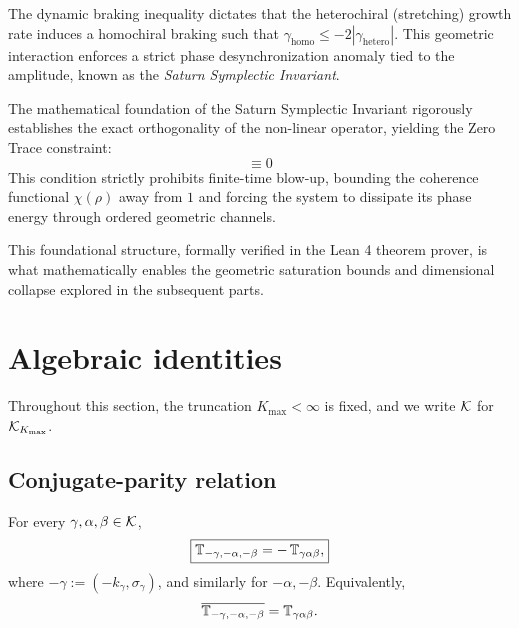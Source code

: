 \begin{theorem}\label{part-1:thm:saturation}
The dynamic braking inequality dictates that the heterochiral (stretching) growth rate induces a homochiral braking such that $\gamma_{\text{homo}} \leq -2 |\gamma_{\text{hetero}}|$. This geometric interaction enforces a strict phase desynchronization anomaly tied to the amplitude, known as the \emph{Saturn Symplectic Invariant}. 
\end{theorem}

\begin{corollary}\label{part-1:cor:zero-trace}
The mathematical foundation of the Saturn Symplectic Invariant rigorously establishes the exact orthogonality of the non-linear operator, yielding the Zero Trace constraint:
\begin{equation}
[\Psi, \Psi] \equiv 0
\end{equation}
This condition strictly prohibits finite-time blow-up, bounding the coherence functional $\chi(\rho)$ away from $1$ and forcing the system to dissipate its phase energy through ordered geometric channels.
\end{corollary}

This foundational structure, formally verified in the Lean 4 theorem prover, is what mathematically enables the geometric saturation bounds and dimensional collapse explored in the subsequent parts.

\section{Algebraic identities}\label{part-1:sec:identities}

Throughout this section, the truncation $K_{\max}<\infty$ is fixed, and 
we write $\mathcal{K}$ for $\mathcal{K}_{K_{\max}}$.

\subsection{Conjugate-parity relation}
\label{part-1:ssec:parity}

\begin{theorem}\label{part-1:thm:parity}
For every $\gamma,\alpha,\beta\in\mathcal{K}$,
\begin{equation}\label{part-1:eq:parity-1}
\boxed{
\mathbb{T}_{-\gamma,-\alpha,-\beta} = -\,\mathbb{T}_{\gamma\alpha\beta},
}
\end{equation}
where $-\gamma := (-k_\gamma, \sigma_\gamma)$, and similarly for 
$-\alpha,-\beta$. Equivalently,
\begin{equation}\label{part-1:eq:parity-2}
\overline{\mathbb{T}_{-\gamma,-\alpha,-\beta}} = \mathbb{T}_{\gamma\alpha\beta}.
\end{equation}
\end{theorem}

